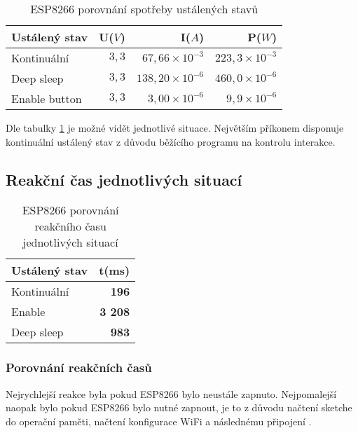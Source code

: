 \documentclass[a4paper, 12pt]{report}
\begin{document}
					\begin{table}[h]
						\centering
						\caption{ESP8266 porovnání spotřeby ustálených stavů}
						\begin{tabular}{||l|r r r||}
							\hline
							Ustálený stav & U($V$) & I($A$) & P($W$)\\
							\hline
							Kontinuální & $3,3$& $67,66 \times 10^{-3}$ & $223,3 \times 10^{-3}$\\
							Deep sleep& $3,3$ & $138,20 \times 10^{-6}$  & $460,0 \times 10^{-6}$\\
							Enable button & $3,3$ & $3,00\times 10^{-6}$ & $9,9\times 10^{-6}$\\
							\hline
						\end{tabular}
						\label{ESP8266 klidové režimy spotřeba}
					\end{table}
					Dle tabulky \ref{ESP8266 klidové režimy spotřeba} je možné vidět jednotlivé situace. Největším příkonem disponuje kontinuální ustálený stav z důvodu běžícího programu na kontrolu interakce.

			\subsection{Reakční čas jednotlivých situací}

				\begin{table}[]
					\centering
					\caption{ESP8266 porovnání reakčního času jednotlivých situací}
					\begin{tabular}{||l|r||}
						\hline
						Ustálený stav & t(ms)\\
						\hline
						Kontinuální & {\bf 196}\\
						Enable & {\bf 3 208}\\
						Deep sleep & {\bf 983}\\
						\hline
					\end{tabular}
					\label{ESP8266 klidové režimy čas}
				\end{table}

				\subsubsection{Porovnání reakčních časů}
					Nejrychlejší reakce byla pokud ESP8266 bylo neustále zapnuto. Nejpomalejší naopak bylo pokud ESP8266 bylo nutné zapnout, je to z důvodu načtení sketche do operační paměti, načtení konfigurace WiFi a následnému připojení .
\end{document}
